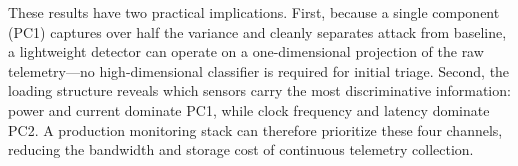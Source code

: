 These results have two practical implications.
First, because a single component (PC1) captures over half the variance
and cleanly separates attack from baseline, a lightweight detector
can operate on a one-dimensional projection of the raw telemetry---no
high-dimensional classifier is required for initial triage.
Second, the loading structure reveals which sensors carry the most
discriminative information: power and current dominate PC1, while
clock frequency and latency dominate PC2.
A production monitoring stack can therefore prioritize these four
channels, reducing the bandwidth and storage cost of continuous
telemetry collection.
